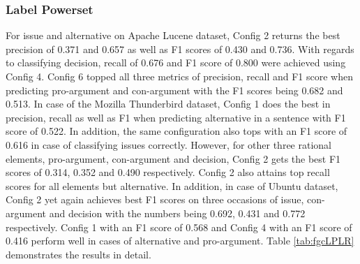 \documentclass[a4paper,12pt,twoside]{report}
\begin{document}
\subsubsection{Label Powerset}
For issue and alternative on Apache Lucene dataset, Config 2 returns the best precision of 0.371 and 0.657 as well as F1 scores of 0.430 and 0.736. With regards to classifying decision, recall of 0.676 and F1 score of 0.800 were achieved using Config 4. Config 6 topped all three metrics of precision, recall and F1 score when predicting pro-argument and con-argument with the F1 scores being 0.682 and 0.513. In case of the Mozilla Thunderbird dataset, Config 1 does the best in precision, recall as well as F1 when predicting alternative in a sentence with F1 score of 0.522. In addition, the same configuration also tops with an F1 score of 0.616 in case of classifying issues correctly. However, for other three rational elements, pro-argument, con-argument and decision, Config 2 gets the best F1 scores of 0.314, 0.352 and 0.490 respectively. Config 2 also attains top recall scores for all elements but alternative. In addition, in case of Ubuntu dataset, Config 2 yet again achieves best F1 scores on three occasions of issue, con-argument and decision with the numbers being 0.692, 0.431 and 0.772 respectively. Config 1 with an F1 score of 0.568 and Config 4 with an F1 score of 0.416 perform well in cases of alternative and pro-argument. Table \ref{tab:fgcLPLR} demonstrates the results in detail.
\end{document}
